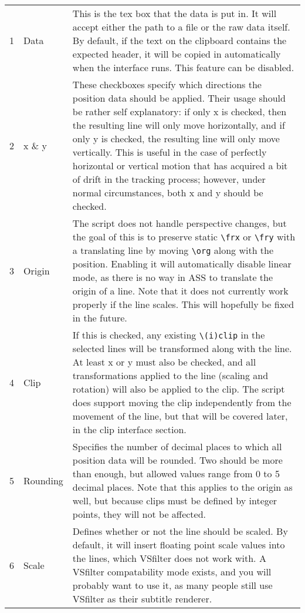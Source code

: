 ﻿\documentclass[a4paper,12pt]{article}
\begin{document}
  \begin{table}[th]
    \centering
    \begin{tabular}{|rlp{12cm}|}
      1 & Data & This is the tex box that the data is put in. It will accept either the path to a file or the raw data itself. By default, if the text on the clipboard contains the expected header, it will be copied in automatically when the interface runs. This feature can be disabled. \\
      2 & x \& y & These checkboxes specify which directions the position data should be applied. Their usage should be rather self explanatory: if only x is checked, then the resulting line will only move horizontally, and if only y is checked, the resulting line will only move vertically. This is useful in the case of perfectly horizontal or vertical motion that has acquired a bit of drift in the tracking process; however, under normal circumstances, both x and y should be checked. \\
      3 & Origin & The script does not handle perspective changes, but the goal of this is to preserve static {\tt\textbackslash{}frx} or {\tt\textbackslash{}fry} with a translating line by moving {\tt\textbackslash{}org} along with the position. Enabling it will automatically disable linear mode, as there is no way in ASS to translate the origin of a line. Note that it does not currently work properly if the line scales. This will hopefully be fixed in the future.\\
      4 & Clip & If this is checked, any existing {\tt\textbackslash{}(i)clip} in the selected lines will be transformed along with the line. At least x or y must also be checked, and all transformations applied to the line (scaling and rotation) will also be applied to the clip. The script does support moving the clip independently from the movement of the line, but that will be covered later, in the clip interface section. \\ %
      5 & Rounding & Specifies the number of decimal places to which all position data will be rounded. Two should be more than enough, but allowed values range from 0 to 5 decimal places. Note that this applies to the origin as well, but because clips must be defined by integer points, they will not be affected. \\
      6 & Scale & Defines whether or not the line should be scaled. By default, it will insert floating point scale values into the lines, which VSfilter does not work with. A VSfilter compatability mode exists, and you will probably want to use it, as many people still use VSfilter as their subtitle renderer. \\

\end{tabular}
\end{table}
\end{document}
